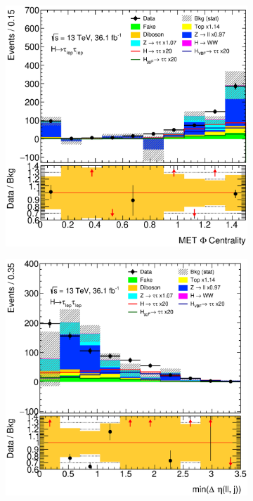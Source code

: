 \begin{figure}[htb]
\begin{subfigure}[t]{0.3\textwidth}
    \end{subfigure}
    \begin{subfigure}[t]{0.3\textwidth}
        \includegraphics[width=\textwidth]{./plots/mva/modeling/input_vars/VBF_SF/ll-CutMVAVBFCatSF-METPhiCentrality2-lin.eps}
    \end{subfigure}
    \begin{subfigure}[t]{0.3\textwidth}
        \includegraphics[width=\textwidth]{./plots/mva/modeling/input_vars/VBF_SF/ll-CutMVAVBFCatSF-MinDEtaDilepJets-lin.eps}

\end{subfigure}
\end{figure}
